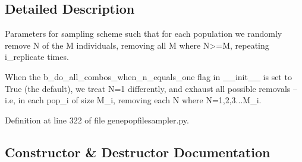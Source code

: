\subsection{Detailed Description}
\begin{DoxyVerb}Parameters for sampling scheme such that for each population
we randomly remove N of the M individuals, removing all M where
N>=M, repeating i_replicate times. 

When the b_do_all_combos_when_n_equals_one flag in __init__ is
set to True (the default), we treat N=1 differently, and 
exhaust all possible removals -- i.e, in each pop_i 
of size M_i, removing each N where N=1,2,3...M_i.
\end{DoxyVerb}
 

Definition at line 322 of file genepopfilesampler.\+py.



\subsection{Constructor \& Destructor Documentation}
